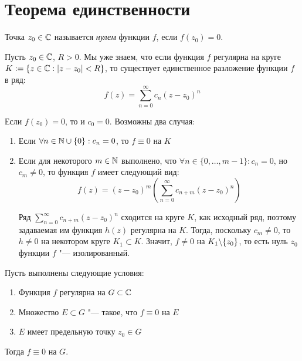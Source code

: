 \section{Теорема единственности}

\begin{definition}
	Точка $z_0 \in \mathbb{C}$ называется \textit{нулем} функции $f$, если $f(z_0) = 0$.
\end{definition}

\pagebreak
\begin{note}
	Пусть $z_0 \in \mathbb{C}$, $R > 0$. Мы уже знаем, что если функция $f$ регулярна на круге $K := \{z \in \mathbb{C}: |z - z_0| < R\}$, то существует единственное разложение функции $f$ в ряд:
	\[f(z) = \sum_{n=0}^\infty c_n(z - z_0)^n\]
	
	Если $f(z_0) = 0$, то и $c_0 = 0$. Возможны два случая:
	\begin{enumerate}
		\item Если $\forall n \in \mathbb{N}\cup \{0\}: c_n = 0$, то $f \equiv 0$ на $K$
		\item Если для некоторого $m \in \mathbb{N}$ выполнено, что $\forall n \in \{0, \dotsc, m - 1\}: c_n = 0$, но $c_m \ne 0$, то функция $f$ имеет следующий вид:
		\[f(z) = (z - z_0)^m\left(\sum_{n = 0}^\infty c_{n + m}(z - z_0)^n\right)\]
		
		Ряд $\sum_{n = 0}^\infty c_{n + m}(z - z_0)^n$ сходится на круге $K$, как исходный ряд, поэтому задаваемая им функция $h(z)$ регулярна на $K$. Тогда, поскольку $c_m \ne 0$, то $h \ne 0$ на некотором круге $K_1 \subset K$. Значит, $f \ne 0$ на $K_1 \backslash \{z_0\}$, то есть нуль $z_0$ функции $f$ "--- изолированный.
	\end{enumerate}
\end{note}

\begin{theorem}
	Пусть выполнены следующие условия:
	\begin{enumerate}
		\item Функция $f$ регулярна на $G \subset \mathbb{C}$
		\item Множество $E \subset G$ "--- такое, что $f \equiv 0$ на $E$
		\item $E$ имеет предельную точку $z_0 \in G$
	\end{enumerate}
	
	Тогда $f \equiv 0$ на $G$.
\end{theorem}

